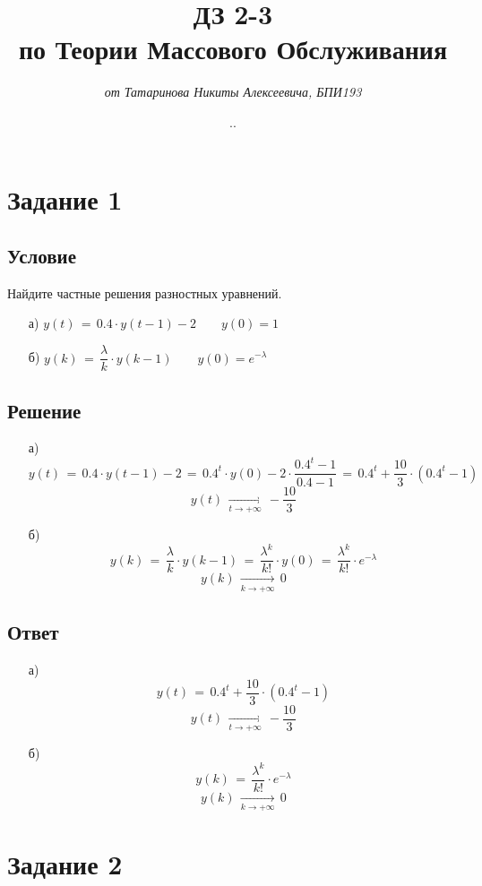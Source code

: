 \documentclass{article}
\title{\textbf{ДЗ 2-3\\по Теории Массового Обслуживания}}
\author{\textit{от Татаринова Никиты Алексеевича, БПИ193}}
\date{\the\year .\twodigits{\the\month}.\twodigits{\the\day}}
\begin{document}
\maketitle
\section*{Задание 1}
\subsection*{Условие}
Найдите частные решения разностных уравнений.
\begin{enumerate}
\item[а)] $ y(t) \, = \, 0.4 \! \cdot \! y(t \! - \! 1) \! - \! 2 \qquad y(0) \! = \! 1 $
\item[б)] $ y(k) \, = \, \dfrac{\lambda}{k} \! \cdot \! y(k \! - \! 1) \qquad y(0) \! = \! e^{-\lambda} $
\end{enumerate}
\subsection*{Решение}
\begin{enumerate}
\item[а)]
\[ y(t) \, = \, 0.4 \! \cdot \! y(t \! - \! 1) \! - \! 2 \, = \, 0.4^t \! \cdot \! y(0) \! - \! 2 \! \cdot \! \dfrac{0.4^t \! - \! 1}{0.4 \! - \! 1} \, = \, 0.4^t \! + \! \dfrac{10}{3} \! \cdot \! (0.4^t \! - \! 1) \]
\[ y(t) \, \underset{t \rightarrow +\infty}{\longrightarrow} \, -\dfrac{10}{3} \]
\item[б)]
\[ y(k) \, = \, \dfrac{\lambda}{k} \! \cdot \! y(k \! - \! 1) \, = \, \dfrac{\lambda^k}{k!} \! \cdot \! y(0) \, = \, \dfrac{\lambda^k}{k!} \! \cdot \! e^{-\lambda} \]
\[ y(k) \, \underset{k \rightarrow +\infty}{\longrightarrow} \, 0 \]
\end{enumerate}
\subsection*{Ответ}
\begin{enumerate}
\item[а)]
\[ y(t) \, = \, 0.4^t \! + \! \dfrac{10}{3} \! \cdot \! (0.4^t \! - \! 1) \]
\[ y(t) \, \underset{t \rightarrow +\infty}{\longrightarrow} \, -\dfrac{10}{3} \]
\item[б)]
\[ y(k) \, = \, \dfrac{\lambda^k}{k!} \! \cdot \! e^{-\lambda} \]
\[ y(k) \, \underset{k \rightarrow +\infty}{\longrightarrow} \, 0 \]
\end{enumerate}
\section*{Задание 2}
\end{document}
